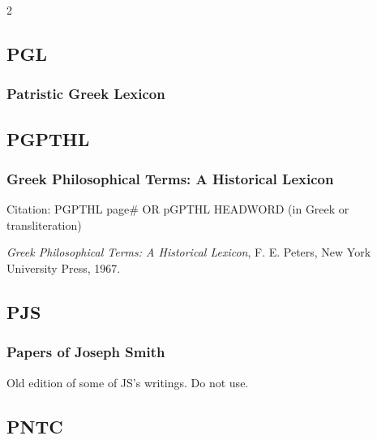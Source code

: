 \begin{multicols}{2}
	\subsection*{PGL}
	
		\subsubsection*{Patristic Greek Lexicon}
		
			\phantom{.}
			
	\subsection*{PGPTHL}
	
		\subsubsection*{Greek Philosophical Terms: A Historical Lexicon}
		
			Citation:
				PGPTHL page\# OR 
				pGPTHL HEADWORD (in Greek or transliteration)
		
			\textit{Greek Philosophical Terms: A Historical Lexicon}, F. E. Peters, New York University Press, 1967.
			
	\subsection*{PJS}
	
		\subsubsection*{Papers of Joseph Smith}
		
			Old edition of some of JS's writings. Do not use.
			
	\subsection*{PNTC}
	

\end{multicols}
